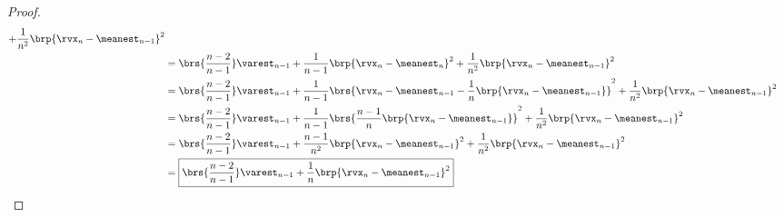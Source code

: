 \begin{proof}
\begin{align*}
      + \frac{1}{n^2} \brp{ \rvx_n - \meanest_{n-1} }^2
   \\&= \brs{\frac{n-2}{n-1}} \varest_{n-1}
      + \frac{1}{n-1} \brp{ \rvx_n - \meanest_n }^2
      + \frac{1}{n^2} \brp{ \rvx_n - \meanest_{n-1} }^2
   \\&= \brs{\frac{n-2}{n-1}} \varest_{n-1}
      + \frac{1}{n-1} \brs{ \rvx_n - \meanest_{n-1} - \frac{1}{n}\brp{ \rvx_n - \meanest_{n-1} } }^2
      + \frac{1}{n^2} \brp{ \rvx_n - \meanest_{n-1} }^2
   \\&= \brs{\frac{n-2}{n-1}} \varest_{n-1}
      + \frac{1}{n-1} \brs{ \frac{n-1}{n} \brp{ \rvx_n - \meanest_{n-1} } }^2
      + \frac{1}{n^2} \brp{ \rvx_n - \meanest_{n-1} }^2
   \\&= \brs{\frac{n-2}{n-1}} \varest_{n-1}
      + \frac{n-1}{n^2} \brp{ \rvx_n - \meanest_{n-1} }^2
      + \frac{  1}{n^2} \brp{ \rvx_n - \meanest_{n-1} }^2
   \\&= \boxed{
          \brs{\frac{n-2}{n-1}} \varest_{n-1}
        + \frac{1}{n} \brp{ \rvx_n - \meanest_{n-1} }^2
        }
\end{align*}
\end{proof}
